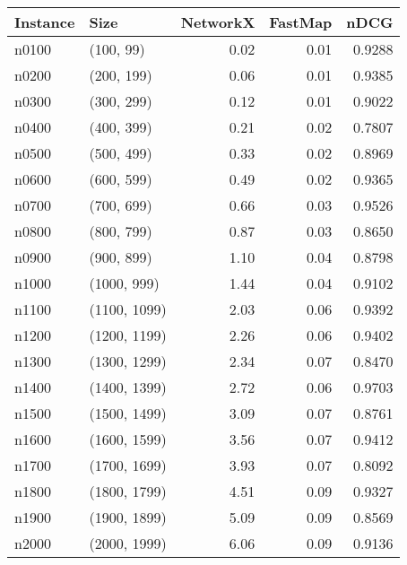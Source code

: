 \begin{tabular}{llrrr}
\toprule
Instance &         Size &  NetworkX &  FastMap &   nDCG \\
\midrule
   n0100 &    (100, 99) &      0.02 &     0.01 & 0.9288 \\
   n0200 &   (200, 199) &      0.06 &     0.01 & 0.9385 \\
   n0300 &   (300, 299) &      0.12 &     0.01 & 0.9022 \\
   n0400 &   (400, 399) &      0.21 &     0.02 & 0.7807 \\
   n0500 &   (500, 499) &      0.33 &     0.02 & 0.8969 \\
   n0600 &   (600, 599) &      0.49 &     0.02 & 0.9365 \\
   n0700 &   (700, 699) &      0.66 &     0.03 & 0.9526 \\
   n0800 &   (800, 799) &      0.87 &     0.03 & 0.8650 \\
   n0900 &   (900, 899) &      1.10 &     0.04 & 0.8798 \\
   n1000 &  (1000, 999) &      1.44 &     0.04 & 0.9102 \\
   n1100 & (1100, 1099) &      2.03 &     0.06 & 0.9392 \\
   n1200 & (1200, 1199) &      2.26 &     0.06 & 0.9402 \\
   n1300 & (1300, 1299) &      2.34 &     0.07 & 0.8470 \\
   n1400 & (1400, 1399) &      2.72 &     0.06 & 0.9703 \\
   n1500 & (1500, 1499) &      3.09 &     0.07 & 0.8761 \\
   n1600 & (1600, 1599) &      3.56 &     0.07 & 0.9412 \\
   n1700 & (1700, 1699) &      3.93 &     0.07 & 0.8092 \\
   n1800 & (1800, 1799) &      4.51 &     0.09 & 0.9327 \\
   n1900 & (1900, 1899) &      5.09 &     0.09 & 0.8569 \\
   n2000 & (2000, 1999) &      6.06 &     0.09 & 0.9136 \\
\bottomrule
\end{tabular}
